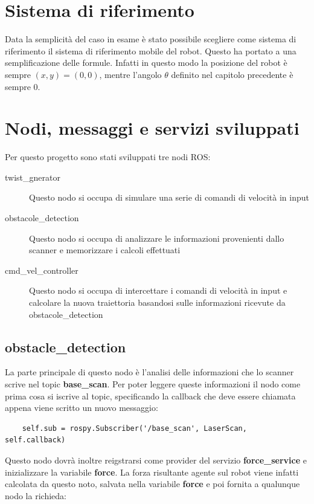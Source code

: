 \documentclass[Lau, binding=0.6cm, oneside]{sapthesis}
\begin{document}
\section{Sistema di riferimento}
Data la semplicità del caso in esame è stato possibile scegliere come sistema di riferimento il sistema di riferimento mobile del robot.
Questo ha portato a una semplificazione delle formule.
Infatti in questo modo la posizione del robot è sempre $\left(x, y\right)=(0,0)$, mentre l'angolo $\theta$ definito nel capitolo precedente è sempre 0.

\section{Nodi, messaggi e servizi sviluppati}
Per questo progetto sono stati sviluppati tre nodi ROS:
\begin{description}
	\item[twist\_gnerator] Questo nodo si occupa di simulare una serie di comandi di velocità in input
	\item[obstacole\_detection] Questo nodo si occupa di analizzare le informazioni provenienti dallo scanner e memorizzare i calcoli effettuati
	\item[cmd\_vel\_controller] Questo nodo si occupa di intercettare i comandi di velocità in input e calcolare la nuova traiettoria basandosi sulle informazioni ricevute da obstacole\_detection
\end{description}

\subsection{obstacle\_detection}
La parte principale di questo nodo è l'analisi delle informazioni che lo scanner scrive nel topic \textbf{base\_scan}.
Per poter leggere queste informazioni il nodo come prima cosa si iscrive al topic, specificando la callback che deve essere chiamata appena viene scritto un nuovo messaggio:

\begin{lstlisting}
	self.sub = rospy.Subscriber('/base_scan', LaserScan, self.callback)
\end{lstlisting}

Questo nodo dovrà inoltre reigstrarsi come provider del servizio \textbf{force\_service} e inizializzare la variabile \textbf{force}.
La forza risultante agente sul robot viene infatti calcolata da questo noto, salvata nella variabile \textbf{force} e poi fornita a qualunque nodo la richieda:
\end{document}

